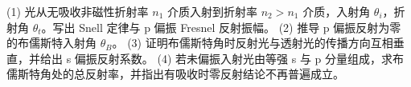 (1) 光从无吸收非磁性折射率 \(n_1\) 介质入射到折射率 \(n_2>n_1\) 介质，入射角 \(\theta_i\)，折射角 \(\theta_t\)。写出 Snell 定律与 p 偏振 Fresnel 反射振幅。
(2) 推导 p 偏振反射为零的布儒斯特入射角 \(\theta_B\)。
(3) 证明布儒斯特角时反射光与透射光的传播方向互相垂直，并给出 s 偏振反射系数。
(4) 若未偏振入射光由等强 s 与 p 分量组成，求布儒斯特角处的总反射率，并指出有吸收时零反射结论不再普遍成立。
